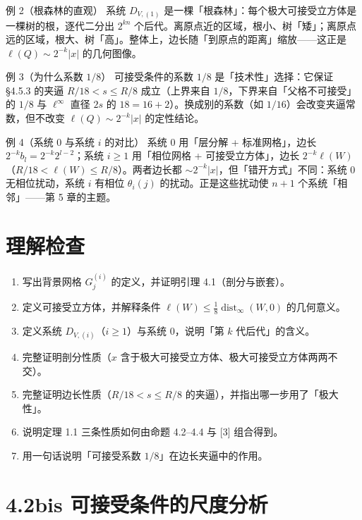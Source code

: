 \documentclass[a4paper,11pt,openany]{ctexbook}
\numberwithin{equation}{chapter}
\numberwithin{figure}{chapter}
\numberwithin{table}{chapter}
\begin{document}
\begin{examplebox}{例 2（根森林的直观）}
系统 $D_{V,(1)}$ 是一棵「根森林」：每个极大可接受立方体是一棵树的根，逐代二分出 $2^{kn}$ 个后代。离原点近的区域，根小、树「矮」；离原点远的区域，根大、树「高」。整体上，边长随「到原点的距离」缩放——这正是 $\ell(Q)\sim2^{-k}|x|$ 的几何图像。
\end{examplebox}

\begin{examplebox}{例 3（为什么系数 $1/8$）}
可接受条件的系数 $1/8$ 是「技术性」选择：它保证 §4.5.3 的夹逼 $R/18<s\le R/8$ 成立（上界来自 $1/8$，下界来自「父格不可接受」的 $1/8$ 与 $\ell^\infty$ 直径 $2s$ 的 $18=16+2$）。换成别的系数（如 $1/16$）会改变夹逼常数，但不改变 $\ell(Q)\sim2^{-k}|x|$ 的定性结论。
\end{examplebox}

\begin{examplebox}{例 4（系统 0 与系统 $i$ 的对比）}
系统 0 用「层分解 + 标准网格」，边长 $2^{-k}b_l=2^{-k}2^{l-2}$；系统 $i\ge1$ 用「相位网格 + 可接受立方体」，边长 $2^{-k}\ell(W)$（$R/18<\ell(W)\le R/8$）。两者边长都 $\sim2^{-k}|x|$，但「错开方式」不同：系统 0 无相位扰动，系统 $i$ 有相位 $\theta_i(j)$ 的扰动。正是这些扰动使 $n+1$ 个系统「相邻」——第 5 章的主题。
\end{examplebox}

\section{理解检查}

\begin{enumerate}
\item 写出背景网格 $G_j^{(i)}$ 的定义，并证明引理 4.1（剖分与嵌套）。
\item 定义可接受立方体，并解释条件 $\ell(W)\le\frac18\operatorname{dist}_\infty(W,0)$ 的几何意义。
\item 定义系统 $D_{V,(i)}$（$i\ge1$）与系统 $0$，说明「第 $k$ 代后代」的含义。
\item 完整证明剖分性质（$x$ 含于极大可接受立方体、极大可接受立方体两两不交）。
\item 完整证明边长性质（$R/18<s\le R/8$ 的夹逼），并指出哪一步用了「极大性」。
\item 说明定理 1.1 三条性质如何由命题 4.2–4.4 与 [3] 组合得到。
\item 用一句话说明「可接受系数 $1/8$」在边长夹逼中的作用。
\end{enumerate}

\section{4.2bis 可接受条件的尺度分析}
\end{document}
